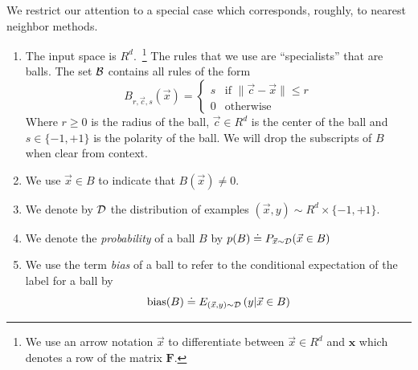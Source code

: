 \documentclass{article}
\newcommand{\err}{\mbox{err}}
\newcommand{\D}{{\cal D}}
\newcommand{\B}{{\cal B}}
\newcommand{\x}{\vec{x}}
\newcommand{\cc}{\vec{c}}
\renewcommand{\SS}{{\cal S}} %
\newcommand{\CC}{{\cal C}}  %
\newcommand{\vF}{\mathbf{F}}
\newcommand{\vx}{\mathbf{x}}
\newcommand{\bias}{\text{bias}}
\newcommand{\ebias}{\widehat{\text{bias}}}
\newcommand{\eD}{\hat{\D}}
\newcommand{\ep}{\hat{p}}
\newcommand{\sign}{\text{sign}}
\begin{document}
We restrict our attention to a special case which corresponds,
roughly, to nearest neighbor methods.
\begin{enumerate}
  \item The input space is $R^d$.~\footnote{We use an arrow notation $\x$ to
    differentiate between $\x \in R^d$ and $\vx$ which denotes a row
    of the matrix $\vF$.}
    The rules that we use are ``specialists'' that are balls. The set
    $\B$ contains all rules of the form 
    \[
    B_{r,\cc,s}(\x) =
    \begin{cases}
      s & \text{if } \| \cc- \x \| \leq r \\
    0 & \text{otherwise }
    \end{cases}
    \]
    Where $r \geq 0$ is the radius of the ball, $\cc \in R^d$ is the
    center of the ball and $s \in \{-1,+1\}$ is the polarity of the ball.
    We will drop the subscripts of $B$ when clear from context.
  \item
    We use $\x \in B$ to indicate that $B(\x) \neq 0$.
  \item
    We denote by $\D$ the distribution of examples $(\x,y) \sim R^d
    \times \{-1,+1\}$.
  \item
    We denote the {\em probability} of a ball $B$ by $p(B) \doteq
    P_{\x \sim \D}(\x \in B)$
  \item
    We use the term {\em bias} of a ball to refer to the conditional
    expectation of the label for a ball by
    $$
    \bias(B) \doteq E_{(\x,y)\sim\D}\left( y|\x \in B \right)
    $$
\end{enumerate}

\newcommand{\edge}{\gamma}
\newcommand{\SepsGamSig}{\SS_{\epsilon,\edge}^{s}}
\newcommand{\SepsGam}{\SS_{\epsilon,\edge}}
\newcommand{\SepsGamMinusSig}{\SS_{\epsilon,\edge}^{-s}}
\newcommand{\ConstrepsGamSig}{\CC_{\epsilon,\edge}^{s}}
\newcommand{\ConstrepsGam}{\CC_{\epsilon,\edge}}
\newcommand{\ConstrepsGamMinusSig}{\CC_{\epsilon,\edge}^{-s}}
\end{document}
